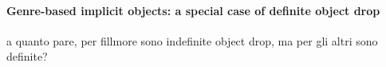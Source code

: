 




\paragraph{Genre-based implicit objects: a special case of definite object drop} 

a quanto pare, per fillmore sono indefinite object drop, ma per gli altri sono definite?


